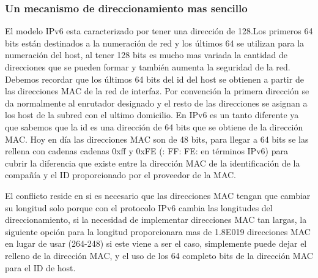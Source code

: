 \documentclass[11pt,a4paper]{article}
\begin{document}
\subsubsection{Un mecanismo de direccionamiento  mas sencillo}
El modelo IPv6 esta  caracterizado por tener  una dirección de 128.Los primeros 64 bits están 
destinados a la numeración de red y los últimos 64 se utilizan para la numeración del host, al tener 
128 bits es mucho mas variada la cantidad de direcciones que se pueden formar y también aumenta la 
seguridad de la red. Debemos recordar que los últimos 64 bits del id del host se obtienen a partir 
de las direcciones MAC de la red de interfaz. Por convención la primera dirección se da normalmente 
al enrutador designado y el resto de las direcciones se asignan a los host de la subred con el 
ultimo domicilio. En IPv6 es un tanto diferente ya que  sabemos que la id es una dirección  de 64 
bits que se obtiene de la dirección MAC. Hoy en día las direcciones MAC son de 48 bits, para llegar 
a 64 bits se las rellena con cadenas cadenas 0xff y 0xFE (: FF: FE: en términos IPv6) para cubrir la 
diferencia que existe entre la dirección MAC de la identificación de la compañía y el ID 
proporcionado por el proveedor de la MAC.\par
El conflicto reside en si es necesario que las direcciones MAC tengan que cambiar su longitud  solo 
porque con el protocolo IPv6 cambia las longitudes del direccionamiento, si la necesidad de 
implementar direcciones MAC tan largas, la siguiente opción para la longitud proporcionara mas de 
1.8E019 direcciones MAC en lugar de usar (264-248) si este viene a ser el
caso, simplemente puede dejar el relleno de la dirección MAC, y el uso de los 64 completo
bits de la dirección MAC para el ID de host.
\end{document}
